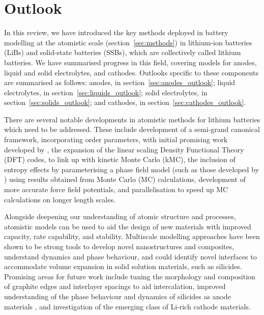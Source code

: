\documentclass[../main.tex]{subfiles}
\begin{document}
\section{Outlook}
In this review, we have introduced the key methods deployed in battery modelling at the atomistic scale (section~\ref{sec:methods}) in lithium-ion batteries (LiBs) and solid-state batteries (SSBs), which are collectively called lithium batteries. We have summarised progress in this field, covering models for anodes, liquid and solid electrolytes, and cathodes. Outlooks specific to these components are summarised as follows: anodes, in section~\ref{sec:anodes_outlook}; liquid electrolytes, in section~\ref{sec:liquids_outlook}; solid electrolytes, in section~\ref{sec:solids_outlook}; and cathodes, in section~\ref{sec:cathodes_outlook}.

There are several notable developments in atomistic methods for lithium batteries which need to be addressed. These include development of a semi-grand canonical framework, incorporating order parameters, with initial promising work developed by \citeauthor{VanderVen2020},\cite{VanderVen2020,vanderven2018} the expansion of the linear scaling Density Functional Theory (DFT) codes,\cite{Goedecker1999,ONETEP2005,ONETEP2020} to link up with kinetic Monte Carlo (kMC), the inclusion of entropy effects by parameterising a phase field model (such as those developed by \citeauthor{Bazant2017})\cite{Bazant2017,peng2011,guo2016} using results obtained from Monte Carlo (MC) calculations, development of more accurate force field potentials, and parallelisation to speed up MC calculations on longer length scales.

Alongside deepening our understanding of atomic structure and processes, atomistic models can be used to aid the design of new materials with improved capacity, rate capability, and stability. Multiscale modelling approaches have been shown to be strong tools to develop novel nanostructures and composites, understand dynamics and phase behaviour, and could identify novel interfaces to accommodate volume expansion in solid solution materials, such as silicides. Promising areas for future work include tuning the morphology and composition of graphite edges\cite{peng2020lithium,weydanz1994behavior,way1994effect} and interlayer spacings\cite{JI201866} to aid intercalation, improved understanding of the phase behaviour and dynamics of silicides as anode materials \cite{Jiang_2020}, and investigation of the emerging class of Li-rich cathode materials.\cite{Hy2016,naylor2019depth,House2020}
\end{document}
